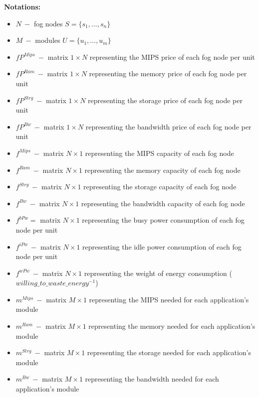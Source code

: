 \documentclass{article}
\begin{document}
\pagebreak
\noindent\textbf{Notations:}
\begin{itemize}
	\item $N~-$ fog nodes $S=\{s_1, ..., s_n\}$
	\item $M~-$ modules $U=\{u_1, ..., u_m\}$\\
	
	\item $fP^{Mips}~-$ matrix $1\times N$ representing the MIPS price of each fog node per unit
	\item $fP^{Ram}~-$ matrix $1\times N$ representing the memory price of each fog node per unit
	\item $fP^{Strg}~-$ matrix $1\times N$ representing the storage price of each fog node per unit
	\item $fP^{Bw}~-$ matrix $1\times N$ representing the bandwidth price of each fog node per unit\\
	
	\item $f^{Mips}~-$ matrix $N\times 1$ representing the MIPS capacity of each fog node
	\item $f^{Ram}~-$ matrix $N\times 1$ representing the memory capacity of each fog node
	\item $f^{Strg}~-$ matrix $N\times 1$ representing the storage capacity of each fog node
	\item $f^{Bw}~-$ matrix $N\times 1$ representing the bandwidth capacity of each fog node
	\item $f^{bPw}=$ matrix $N\times 1$ representing the busy power consumption of each fog node per unit
	\item $f^{iPw}~-$ matrix $N\times 1$ representing the idle power consumption of each fog node per unit
	\item $f^{wPw}~-$ matrix $N\times 1$ representing the weight of energy consumption ($willing\_to\_waste\_energy^{-1}$)\\
	
	\item $m^{Mips}~-$ matrix $M\times 1$ representing the MIPS needed for each application's module
	\item $m^{Ram}~-$ matrix $M\times 1$ representing the memory needed for each application's module
	\item $m^{Strg}~-$ matrix $M\times 1$ representing the storage needed for each application's module
	\item $m^{Bw}~-$ matrix $M\times 1$ representing the bandwidth needed for each application's module\\
	

\end{itemize}
\end{document}
